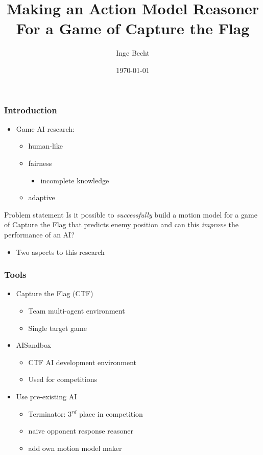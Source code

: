 \documentclass{beamer}
\title[Action Model Reasoner]{Making an Action Model Reasoner
    For a Game of Capture
the Flag}
\author{Inge Becht}
\institute[University of Amsterdam]
{
University of Amsterdam \\
\medskip
{}
}
\date{\today}
\begin{document}
%
\begin{frame}
    \titlepage
\end{frame}

\begin{frame}
    \frametitle{Introduction}
    \begin{itemize}
        \item{Game AI research:}
            \begin{itemize}
                \item human-like
                \item {\color{red}fairness}
                    \begin{itemize}
                        \item incomplete knowledge
                    \end{itemize}
                \item adaptive
            \end{itemize}
    \end{itemize}
    \begin{block}{Problem statement}
        Is it possible to \emph{successfully} build a motion model for a game of Capture the Flag that predicts enemy
        position and can this \emph{improve} the performance of an AI?
    \end{block}
\begin{itemize}
    \item Two aspects to this research
\end{itemize}
\end{frame}

\begin{frame}
    \frametitle{Tools}
    \begin{itemize}
        \item{Capture the Flag (CTF)}
            \begin{itemize}
                \item Team multi-agent environment
                \item Single target game
            \end{itemize}
        \item{AISandbox}
            \begin{itemize}
                \item CTF AI development environment
                \item Used for competitions
            \end{itemize}
        \item{Use pre-existing AI}
            \begin{itemize}
                \item Terminator: 3$^{rd}$ place in competition
                \item naive opponent response reasoner
                \item add own motion model maker
            \end{itemize}
    \end{itemize}
\end{frame}
\end{document}
